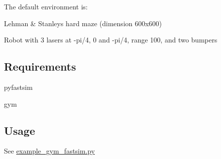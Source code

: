 The default environment is\+:
\begin{DoxyItemize}
\item Lehman \& Stanley\textquotesingle{}s hard maze (dimension 600x600)
\item Robot with 3 lasers at -\/pi/4, 0 and -\/pi/4, range 100, and two bumpers
\end{DoxyItemize}

\subsection*{Requirements}


\begin{DoxyItemize}
\item pyfastsim
\item gym
\end{DoxyItemize}

\subsection*{Usage}

See \hyperlink{example__gym__fastsim_8py}{example\+\_\+gym\+\_\+fastsim.\+py} 